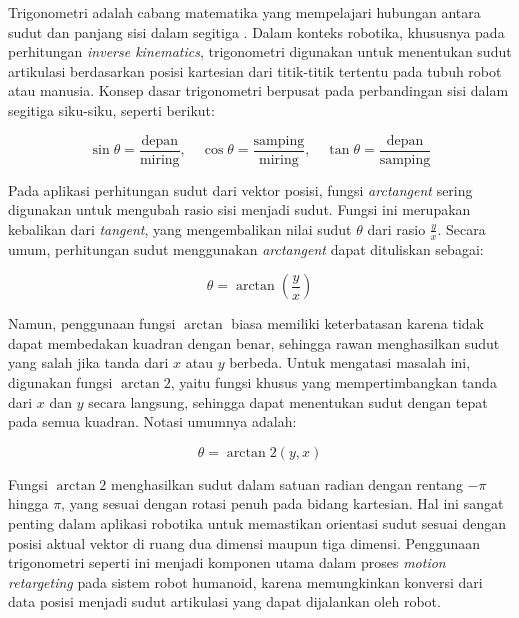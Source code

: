 Trigonometri adalah cabang matematika yang mempelajari hubungan antara sudut dan panjang sisi dalam segitiga . Dalam konteks robotika, khususnya pada perhitungan \textit{inverse kinematics}, trigonometri digunakan untuk menentukan sudut artikulasi berdasarkan posisi kartesian dari titik-titik tertentu pada tubuh robot atau manusia. Konsep dasar trigonometri berpusat pada perbandingan sisi dalam segitiga siku-siku, seperti berikut:

\begin{equation}
\sin \theta = \frac{\text{depan}}{\text{miring}}, \quad
\cos \theta = \frac{\text{samping}}{\text{miring}}, \quad
\tan \theta = \frac{\text{depan}}{\text{samping}}
\end{equation}

Pada aplikasi perhitungan sudut dari vektor posisi, fungsi \textit{arctangent} sering digunakan untuk mengubah rasio sisi menjadi sudut. Fungsi ini merupakan kebalikan dari \textit{tangent}, yang mengembalikan nilai sudut \(\theta\) dari rasio \(\frac{y}{x}\). Secara umum, perhitungan sudut menggunakan \textit{arctangent} dapat dituliskan sebagai:

\begin{equation}
\theta = \arctan\left(\frac{y}{x}\right)
\end{equation}

Namun, penggunaan fungsi \(\arctan\) biasa memiliki keterbatasan karena tidak dapat membedakan kuadran dengan benar, sehingga rawan menghasilkan sudut yang salah jika tanda dari \(x\) atau \(y\) berbeda. Untuk mengatasi masalah ini, digunakan fungsi \(\arctan2\), yaitu fungsi khusus yang mempertimbangkan tanda dari \(x\) dan \(y\) secara langsung, sehingga dapat menentukan sudut dengan tepat pada semua kuadran. Notasi umumnya adalah:

\begin{equation}
\theta = \arctan2(y, x)
\end{equation}

Fungsi \(\arctan2\) menghasilkan sudut dalam satuan radian dengan rentang \(-\pi\) hingga \(\pi\), yang sesuai dengan rotasi penuh pada bidang kartesian. Hal ini sangat penting dalam aplikasi robotika untuk memastikan orientasi sudut sesuai dengan posisi aktual vektor di ruang dua dimensi maupun tiga dimensi. Penggunaan trigonometri seperti ini menjadi komponen utama dalam proses \textit{motion retargeting} pada sistem robot humanoid, karena memungkinkan konversi dari data posisi menjadi sudut artikulasi yang dapat dijalankan oleh robot.


